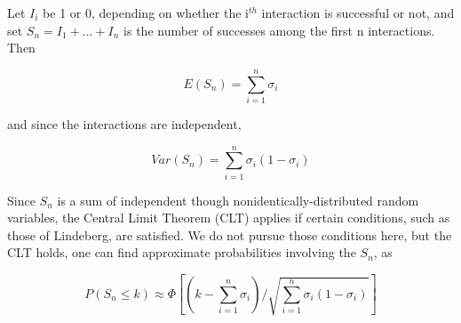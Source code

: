 \documentclass[11pt]{article}
\begin{document}
Let $I_i$ be 1 or 0, depending on whether the i$^{th}$ interaction is
successful or not, and set $S_n = I_1 +...+ I_n$ is the number of
successes among the first n interactions.  Then

\begin{equation}
E(S_n) = \sum_{i=1}^n \sigma_i
\end{equation}

and since the interactions are independent, 

\begin{equation}
Var(S_n) = \sum_{i=1}^n \sigma_i (1 - \sigma_i)
\end{equation}

Since $S_n$ is a sum of independent though nonidentically-distributed
random variables, the Central Limit Theorem (CLT) applies if certain
conditions, such as those of Lindeberg, are satisfied.  We do not pursue
those conditions here, but the CLT holds, one can find approximate
probabilities involving the $S_n$, as

\begin{equation}
P(S_n \leq k) \approx \Phi \left [(k-\sum_{i=1}^n \sigma_i)/
\sqrt{\sum_{i=1}^n \sigma_i (1 - \sigma_i)} \right ]
\end{equation}
\end{document}
